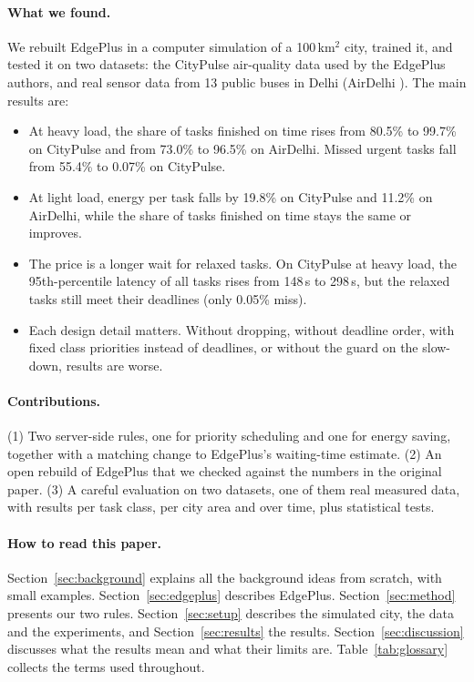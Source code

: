 \documentclass[11pt]{article}
\theoremstyle{definition}
\begin{document}
\paragraph{What we found.} We rebuilt EdgePlus in a computer simulation of a 100\,km$^2$ city, trained it, and
tested it on two datasets: the CityPulse air-quality data used by the EdgePlus authors, and real sensor data
from 13 public buses in Delhi (AirDelhi \cite{airdelhi2023}). The main results are:
\begin{itemize}
\item At heavy load, the share of tasks finished on time rises from 80.5\% to 99.7\% on CityPulse and from
73.0\% to 96.5\% on AirDelhi. Missed urgent tasks fall from 55.4\% to 0.07\% on CityPulse.
\item At light load, energy per task falls by 19.8\% on CityPulse and 11.2\% on AirDelhi, while the share of
tasks finished on time stays the same or improves.
\item The price is a longer wait for relaxed tasks. On CityPulse at heavy load, the 95th-percentile latency of
all tasks rises from 148\,s to 298\,s, but the relaxed tasks still meet their deadlines (only 0.05\% miss).
\item Each design detail matters. Without dropping, without deadline order, with fixed class priorities instead
of deadlines, or without the guard on the slow-down, results are worse.
\end{itemize}

\paragraph{Contributions.} (1) Two server-side rules, one for priority scheduling and one for energy saving,
together with a matching change to EdgePlus's waiting-time estimate. (2) An open rebuild of EdgePlus that we
checked against the numbers in the original paper. (3) A careful evaluation on two datasets, one of them real
measured data, with results per task class, per city area and over time, plus statistical tests.

\paragraph{How to read this paper.} Section~\ref{sec:background} explains all the background ideas from scratch,
with small examples. Section~\ref{sec:edgeplus} describes EdgePlus. Section~\ref{sec:method} presents our two
rules. Section~\ref{sec:setup} describes the simulated city, the data and the experiments, and
Section~\ref{sec:results} the results. Section~\ref{sec:discussion} discusses what the results mean and what
their limits are. Table~\ref{tab:glossary} collects the terms used throughout.
\end{document}
